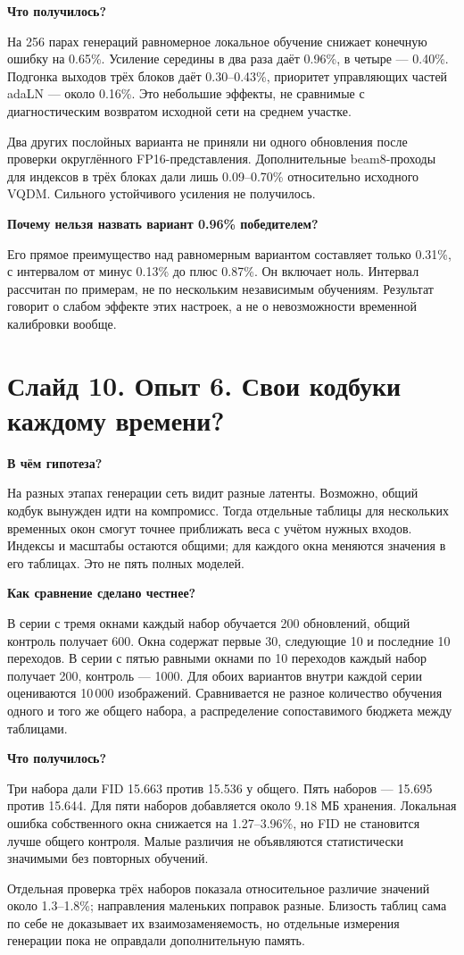 \documentclass[a4paper,11pt]{article}
\newcommand{\slide}[2]{\clearpage\section*{Слайд #1. #2}}
\newcommand{\question}[1]{\par\textbf{#1}\par}
\begin{document}
\question{Что получилось?}
На 256 парах генераций равномерное локальное обучение снижает конечную
ошибку на 0.65\%. Усиление середины в два раза даёт 0.96\%, в четыре ---
0.40\%. Подгонка выходов трёх блоков даёт 0.30--0.43\%, приоритет управляющих
частей adaLN --- около 0.16\%. Это небольшие эффекты, не сравнимые с
диагностическим возвратом исходной сети на среднем участке.

Два других послойных варианта не приняли ни одного обновления после
проверки округлённого FP16-представления. Дополнительные beam8-проходы
для индексов в трёх блоках дали лишь 0.09--0.70\% относительно исходного
VQDM. Сильного устойчивого усиления не получилось.

\question{Почему нельзя назвать вариант 0.96\% победителем?}
Его прямое преимущество над равномерным вариантом составляет только 0.31\%,
с интервалом от минус 0.13\% до плюс 0.87\%. Он включает ноль.
Интервал рассчитан по примерам, не по нескольким независимым обучениям.
Результат говорит о слабом эффекте этих настроек, а не о невозможности
временной калибровки вообще.

\slide{10}{Опыт 6. Свои кодбуки каждому времени?}
\question{В чём гипотеза?}
На разных этапах генерации сеть видит разные латенты. Возможно, общий
кодбук вынужден идти на компромисс. Тогда отдельные таблицы для нескольких
временных окон смогут точнее приближать веса с учётом нужных входов.
Индексы и масштабы остаются общими; для каждого окна меняются значения
в его таблицах. Это не пять полных моделей.

\question{Как сравнение сделано честнее?}
В серии с тремя окнами каждый набор обучается 200 обновлений, общий контроль
получает 600. Окна содержат первые 30, следующие 10 и последние 10 переходов.
В серии с пятью равными окнами по 10 переходов каждый набор получает 200,
контроль --- 1000.
Для обоих вариантов внутри каждой серии оцениваются 10\,000 изображений.
Сравнивается не разное количество обучения одного и того же общего набора,
а распределение сопоставимого бюджета между таблицами.

\question{Что получилось?}
Три набора дали FID 15.663 против 15.536 у общего. Пять наборов --- 15.695
против 15.644. Для пяти наборов добавляется около 9.18 МБ хранения.
Локальная ошибка собственного окна снижается на 1.27--3.96\%, но FID
не становится лучше общего контроля. Малые различия не объявляются
статистически значимыми без повторных обучений.

Отдельная проверка трёх наборов показала относительное различие значений
около 1.3--1.8\%; направления маленьких поправок разные. Близость таблиц
сама по себе не доказывает их взаимозаменяемость, но отдельные измерения
генерации пока не оправдали дополнительную память.
\end{document}
